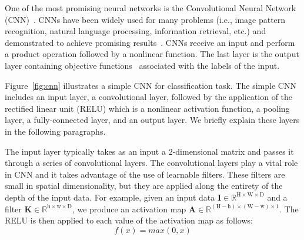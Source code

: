 
One of the most promising neural networks is the Convolutional Neural Network (CNN)~\cite{lecun2015deep}. CNNs have been widely used for many problems (i.e., image pattern recognition, natural language processing, information retrieval, etc.) and demonstrated to achieve promising results~\cite{karpathy2014large, lawrence1997face, krizhevsky2012imagenet}. CNNs receive an input and perform a product operation followed by a nonlinear function. The last layer is the output layer containing objective functions~\cite{zhao2017loss} associated with the labels of the input.

Figure~\ref{fig:cnn} illustrates a simple CNN for classification task. The simple CNN includes an input layer, a convolutional layer, followed by the application of the rectified linear unit (RELU) which is a nonlinear activation function, a pooling layer, a fully-connected layer, and an output layer. We briefly explain these layers in the following paragraphs. 

The input layer typically takes as an input a 2-dimensional matrix and passes it through a series of convolutional layers. The convolutional layers play a vital role in CNN and it takes advantage of the use of learnable filters. These filters are small in spatial dimensionality, but they are applied along the entirety of the depth of the input data. For example, given an input data $\textbf{I} \in \mathbb{R}^{\text{H} \times \text{W} \times \text{D}}$ and a filter $\textbf{K} \in \mathbb{R}^{\text{h} \times \text{w} \times \text{D}}$, we produce an activation map $\textbf{A} \in \mathbb{R}^{(\text{H} - \text{h}) \times (\text{W} - \text{w}) \times 1}$. The RELU is then applied to each value of the activation map as follows:
\begin{equation}
\label{eq:relu}
f(x) = max(0, x)   
\end{equation}

